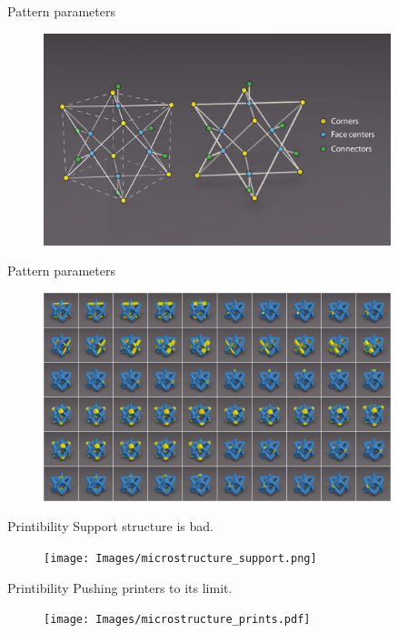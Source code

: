 
\begin{frame}{Pattern parameters}
\begin{figure}
\includegraphics[width=0.9\textwidth]{Images/brick5_parameters.pdf}
\end{figure}
\end{frame}


\begin{frame}{Pattern parameters}
\begin{figure}
\hspace{\fill}
\includegraphics[width=0.9\textwidth]{Images/brick5_param.png}
\hspace{\fill}
\end{figure}
\end{frame}

\begin{frame}{Printibility}
Support structure is bad.
\begin{figure}
\texttt{[image: Images/microstructure\_support.png]}
\end{figure}
\end{frame}

\begin{frame}{Printibility}
Pushing printers to its limit.
\begin{figure}
\texttt{[image: Images/microstructure\_prints.pdf]}
\end{figure}
\end{frame}

